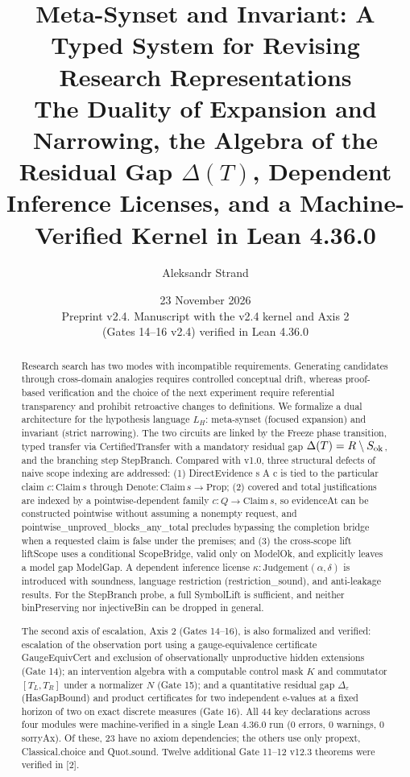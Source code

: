 \documentclass[11pt,a4paper]{article}
\title{Meta-Synset and Invariant: A Typed System for Revising Research Representations\\[0.7em]
\large The Duality of Expansion and Narrowing, the Algebra of the Residual Gap \(\Delta(T)\), Dependent Inference Licenses, and a Machine-Verified Kernel in Lean 4.36.0}
\author{Aleksandr Strand}
\date{23 November 2026\\[0.3em]\small Preprint v2.4. Manuscript with the v2.4 kernel and Axis 2\\(Gates 14--16 v2.4) verified in Lean 4.36.0}
\begin{document}
\maketitle
\begin{abstract}

Research search has two modes with incompatible requirements. Generating candidates through cross-domain analogies requires controlled conceptual drift, whereas proof-based verification and the choice of the next experiment require referential transparency and prohibit retroactive changes to definitions. We formalize a dual architecture for the hypothesis language \(L_H\): meta-synset (focused expansion) and invariant (strict narrowing). The two circuits are linked by the Freeze phase transition, typed transfer via CertifiedTransfer with a mandatory residual gap \(\Delta(T)=R\setminus S_{\rm ok}\), and the branching step StepBranch. Compared with v1.0, three structural defects of naive scope indexing are addressed: (1) DirectEvidence s A c is tied to the particular claim \(c:\mathrm{Claim}\,s\) through \(\mathrm{Denote}:\mathrm{Claim}\,s\to\mathrm{Prop}\); (2) covered and total justifications are indexed by a pointwise-dependent family \(c:Q\to\mathrm{Claim}\,s\), so evidenceAt can be constructed pointwise without assuming a nonempty request, and pointwise\_\allowbreak unproved\_\allowbreak blocks\_\allowbreak any\_\allowbreak total precludes bypassing the completion bridge when a requested claim is false under the premises; and (3) the cross-scope lift liftScope uses a conditional ScopeBridge, valid only on ModelOk, and explicitly leaves a model gap ModelGap. A dependent inference license \(\kappa:\mathrm{Judgement}(\alpha,\delta)\) is introduced with soundness, language restriction (restriction\_\allowbreak sound), and anti-leakage results. For the StepBranch probe, a full SymbolLift is sufficient, and neither binPreserving nor injectiveBin can be dropped in general.

The second axis of escalation, Axis 2 (Gates 14–16), is also formalized and verified: escalation of the observation port using a gauge-equivalence certificate GaugeEquivCert and exclusion of observationally unproductive hidden extensions (Gate 14); an intervention algebra with a computable control mask \(K\) and commutator \([T_L,T_R]\) under a normalizer \(N\) (Gate 15); and a quantitative residual gap \(\Delta_\varepsilon\) (HasGapBound) and product certificates for two independent e-values at a fixed horizon of two on exact discrete measures (Gate 16). All 44 key declarations across four modules were machine-verified in a single Lean 4.36.0 run (0 errors, 0 warnings, 0 sorryAx). Of these, 23 have no axiom dependencies; the others use only propext, Classical.choice and Quot.sound. Twelve additional Gate 11–12 v12.3 theorems were verified in [2].

\end{abstract}
\end{document}
